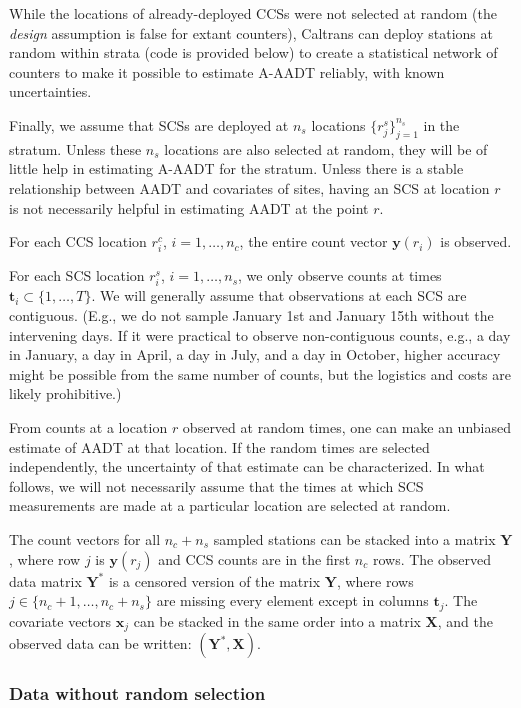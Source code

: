 \documentclass[11pt]{article}
\begin{document}
While the locations of already-deployed CCSs were not selected at random
(the \emph{design} assumption is false for extant counters), Caltrans
can deploy stations at random within strata (code is provided below) to
create a statistical network of counters to make it possible to estimate
A-AADT reliably, with known uncertainties.

Finally, we assume that SCSs are deployed at \(n_s\) locations
\(\{r_j^s\}_{j=1}^{n_s}\) in the stratum. Unless these \(n_s\) locations
are also selected at random, they will be of little help in estimating
A-AADT for the stratum. Unless there is a stable relationship between
AADT and covariates of sites, having an SCS at location \(r\) is not
necessarily helpful in estimating AADT at the point \(r\).

    For each CCS location \(r_i^c\), \(i = 1, \ldots, n_c\), the entire
count vector \(\mathbf{y}(r_i)\) is observed.

For each SCS location \(r_i^s\), \(i = 1, \ldots, n_s\), we only observe
counts at times \(\mathbf{t}_i \subset \{1,\ldots,T\}\). We will
generally assume that observations at each SCS are contiguous. (E.g., we
do not sample January 1st and January 15th without the intervening days.
If it were practical to observe non-contiguous counts, e.g., a day in
January, a day in April, a day in July, and a day in October, higher
accuracy might be possible from the same number of counts, but the
logistics and costs are likely prohibitive.)

From counts at a location \(r\) observed at random times, one can make
an unbiased estimate of AADT at that location. If the random times are
selected independently, the uncertainty of that estimate can be
characterized. In what follows, we will not necessarily assume that the
times at which SCS measurements are made at a particular location are
selected at random.

The count vectors for all \(n_c + n_s\) sampled stations can be stacked
into a matrix \(\mathbf{Y}\), where row \(j\) is \(\mathbf{y}(r_j)\) and
CCS counts are in the first \(n_c\) rows. The observed data matrix
\(\mathbf{Y}^*\) is a censored version of the matrix \(\mathbf{Y}\),
where rows \(j \in \{n_c + 1, \ldots, n_c + n_s\}\) are missing every
element except in columns \(\mathbf{t}_j\). The covariate vectors
\(\mathbf{x}_j\) can be stacked in the same order into a matrix
\(\mathbf{X}\), and the observed data can be written:
\((\mathbf{Y}^*, \mathbf{X})\).

\subsubsection{Data without random
selection}\label{data-without-random-selection}
\end{document}
